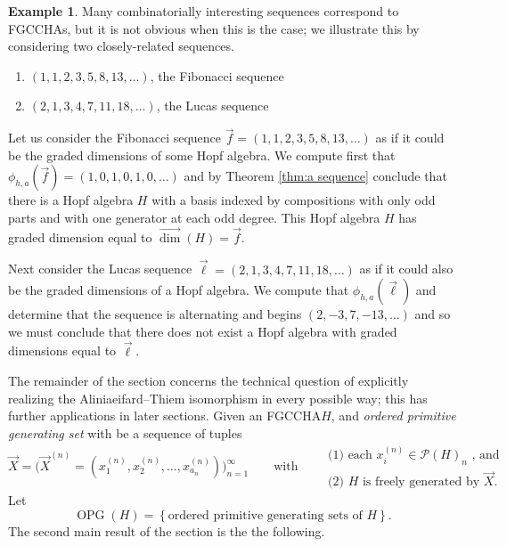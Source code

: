 \documentclass[11pt]{amsart}
\theoremstyle{definition}
\newtheorem{example}[theorem]{Example}
\numberwithin{equation}{section}
\newcommand{\FGCCHA}{\textsf{FGCCHA}\xspace}
\newcommand{\FGCCHAs}{\textsf{FGCCHA}s\xspace}
\newcommand{\vecdim}{\overrightarrow{\dim}}
\newcommand{\OPG}{\operatorname{OPG}}
\begin{document}
\begin{example}
Many combinatorially interesting sequences correspond to \FGCCHAs, but it is not obvious when this is the case; we illustrate this by considering two closely-related sequences.
\begin{enumerate}
\item $(1,1,2,3,5,8,13,\ldots)$, the Fibonacci sequence

\item $(2,1,3,4,7,11,18,\ldots)$, the Lucas sequence
\end{enumerate}
Let us consider the Fibonacci sequence $\vec{f} = (1,1,2,3,5,8,13,\ldots)$
as if it could be the graded dimensions of some Hopf algebra.
We compute first that $\phi_{h,a}(\vec{f}) = (1,0,1,0,1,0,\ldots)$
and by Theorem \ref{thm:a sequence} conclude
that there is a Hopf algebra $H$ with a basis indexed by
compositions with only odd parts and with one generator at each odd degree.
This Hopf algebra $H$ has graded dimension equal to $\vecdim(H) = \vec{f}$.

Next consider the Lucas sequence $\vec{\ell} = (2,1,3,4,7,11,18,\ldots)$
as if it could also be the graded dimensions of a Hopf algebra.  We compute that $\phi_{h,a}(\vec{\ell})$ and determine
that the sequence is alternating and begins $(2, -3, 7, -13,\ldots)$ and so we must conclude
that there does not exist a Hopf algebra with graded dimensions equal to $\vec{\ell}$.
\end{example}

The remainder of the section concerns the technical question of explicitly realizing the Aliniaeifard--Thiem isomorphism in every possible way; this has further applications in later sections.
Given an \FGCCHA $H$, and \emph{ordered primitive generating set} with be a sequence of tuples 
\[
\vec{X} = \Big(\vec{X}^{(n)} = (x_{1}^{(n)}, x_{2}^{(n)}, \ldots, x_{a_{n}}^{(n)})\Big)_{n = 1}^{\infty}
\qquad\text{with}\qquad
\begin{array}{l}
\text{(1) each $x_{i}^{(n)} \in \mathcal{P}(H)_{n}$ , and} \\
\text{(2) $H$ is freely generated by $\vec{X}$.}
\end{array}
\]
Let
\[
\OPG(H) = \left\{ \text{ordered primitive generating sets of $H$} \right\}.
\]
The second main result of the section is the the following.
\end{document}

